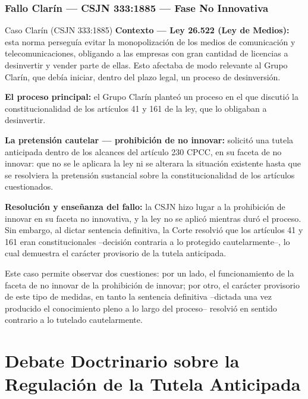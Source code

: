 \documentclass[12pt,oneside]{book}
\begin{document}
\subsection{Fallo Clarín --- CSJN 333:1885 --- Fase No Innovativa}

\begin{example}{Caso Clarín (CSJN 333:1885)}
\textbf{Contexto --- Ley 26.522 (Ley de Medios):} esta norma perseguía evitar la monopolización de los medios de comunicación y telecomunicaciones, obligando a las empresas con gran cantidad de licencias a desinvertir y vender parte de ellas. Esto afectaba de modo relevante al Grupo Clarín, que debía iniciar, dentro del plazo legal, un proceso de desinversión.

\textbf{El proceso principal:} el Grupo Clarín planteó un proceso en el que discutió la constitucionalidad de los artículos 41 y 161 de la ley, que lo obligaban a desinvertir.

\textbf{La pretensión cautelar --- prohibición de no innovar:} solicitó una tutela anticipada dentro de los alcances del artículo 230 CPCC, en su faceta de no innovar: que no se le aplicara la ley ni se alterara la situación existente hasta que se resolviera la pretensión sustancial sobre la constitucionalidad de los artículos cuestionados.

\textbf{Resolución y enseñanza del fallo:} la CSJN hizo lugar a la prohibición de innovar en su faceta no innovativa, y la ley no se aplicó mientras duró el proceso. Sin embargo, al dictar sentencia definitiva, la Corte resolvió que los artículos 41 y 161 eran constitucionales --decisión contraria a lo protegido cautelarmente--, lo cual demuestra el carácter provisorio de la tutela anticipada.
\end{example}

Este caso permite observar dos cuestiones: por un lado, el funcionamiento de la faceta de no innovar de la prohibición de innovar; por otro, el carácter provisorio de este tipo de medidas, en tanto la sentencia definitiva --dictada una vez producido el conocimiento pleno a lo largo del proceso-- resolvió en sentido contrario a lo tutelado cautelarmente.

\chapter[Debate Doctrinario sobre la Tutela Anticipada]{Debate Doctrinario sobre la Regulación de la Tutela Anticipada}
\end{document}
